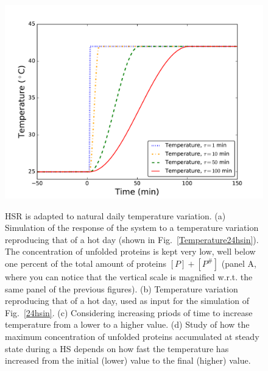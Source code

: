 \documentclass[oneside, 10pt, a4paper, twocolumn]{article}
\begin{document}
\begin{figure}
{  \includegraphics[width=\textwidth, height=0.20\textheight]{TemperatureManyTaus.pdf}
  }%
\endminipage\hfill
{}
\endminipage\hfill
\caption{\small{HSR is adapted to natural daily temperature variation. (a) Simulation of the response of the system to a temperature variation reproducing that of a hot day (shown in Fig.~\ref{Temperature24hsin}). The concentration of unfolded proteins is kept very low, well below one percent of the total amount of proteins $\left[P\right]+\left[P^\#\right]$ (panel A, where you can notice that the vertical scale is magnified w.r.t. the same panel of the previous figures). (b) Temperature variation reproducing that of a hot day, used as input for the simulation of Fig.~\ref{24hsin}. (c) Considering increasing priods of time to increase temperature from a lower to a higher value. (d) Study of how the maximum concentration of unfolded proteins accumulated at steady state during a HS depends on how fast the temperature has increased from the initial (lower) value to the final (higher) value.}}
  \label{Fig3Results}
\end{figure}
\end{document}
